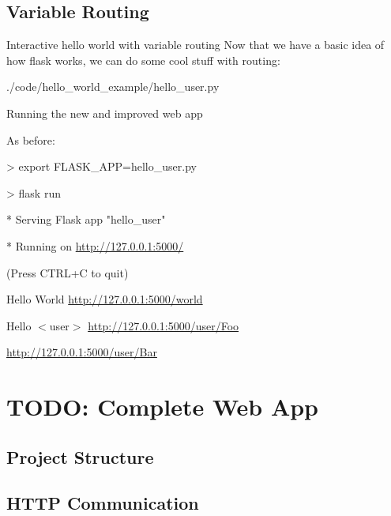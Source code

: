 \documentclass{beamer}
\begin{document}
\subsection{Variable Routing}
	\begin{frame}[t]{Interactive hello world with variable routing}
		Now that we have a basic idea of how flask works, we can do some cool
		stuff with routing:
		\begin{block}{./code/hello\_world\_example/hello\_user.py}
			
		\end{block}
	\end{frame}

	\begin{frame}[t]{Running the new and improved web app}
		\begin{block}{As before:}
			\begin{semiverbatim}
				> export FLASK\_APP=hello\_user.py

				> flask run

				* Serving Flask app "hello\_user"

				* Running on \url{http://127.0.0.1:5000/}

					(Press CTRL+C to quit)
			\end{semiverbatim}
		\end{block}
		\pause

		\begin{block}{Hello World}
			\url{http://127.0.0.1:5000/world}
		\end{block}

		\begin{block}{Hello $<$user$>$}
			\url{http://127.0.0.1:5000/user/Foo}

			\url{http://127.0.0.1:5000/user/Bar}
		\end{block}
	\end{frame}

\section{TODO: Complete Web App}

\subsection{Project Structure}

\subsection{HTTP Communication}
\end{document}
